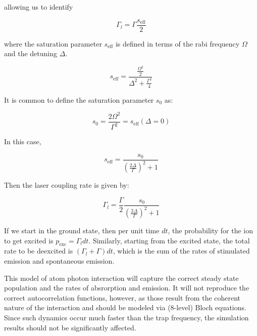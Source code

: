 \documentclass[a4paper,10pt]{article}
\begin{document}
allowing us to identify

\begin{equation}
\Gamma_l = \Gamma \frac{s_{\text{eff}}}{2} 
\end{equation}

where the saturation parameter $s_{\text{eff}}$ is defined in terms of the rabi frequency $\Omega$ and the detuning $\Delta$.

\begin{equation}
s_{\text{eff}} = \frac{\frac{\Omega^2}{2}}{\Delta^2 + \frac{\Gamma^2}{4}}
\end{equation}

It is common to define the saturation parameter $s_0$ as:

\begin{equation}
s_0 = \frac{2 \Omega^2}{\Gamma^2} = s_{\text{eff}} \left(\Delta = 0 \right)
\end{equation}

In this case,

\begin{equation}
s_{\text{eff}} = \frac{s_0}{\left(\frac{2 \Delta}{\Gamma}\right)^2 + 1}
\end{equation}

Then the laser coupling rate is given by:

\begin{equation}
 \Gamma_l = \frac{\Gamma}{2} \frac{s_0}{\left(\frac{2 \Delta}{\Gamma}\right)^2 + 1}
\end{equation}

If we start in the ground state, then per unit time $dt$, the probability for the ion to get excited is $p_\text{exc} = \Gamma_l dt$. Similarly, starting from the excited state,
the total rate to be deexcited is $\left( \Gamma_l + \Gamma \right) dt$, which is the sum of the rates of stimulated emission and spontaneous emission. 

This model of atom photon interaction will capture the correct steady state population and the rates of absrorption and emission. It will not reproduce the correct
autocorrelation functions, however, as those result from the coherent nature of the interaction and should be modeled via (8-level) Bloch equations. Since such dynamics
occur much faster than the trap frequency, the simulation results should not be significantly affected.
\end{document}
